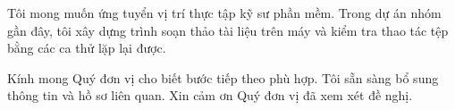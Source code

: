 Tôi mong muốn ứng tuyển vị trí thực tập kỹ sư phần mềm. Trong dự án nhóm gần đây, tôi xây dựng trình soạn thảo tài liệu trên máy và kiểm tra thao tác tệp bằng các ca thử lặp lại được.

Kính mong Quý đơn vị cho biết bước tiếp theo phù hợp. Tôi sẵn sàng bổ sung thông tin và hồ sơ liên quan. Xin cảm ơn Quý đơn vị đã xem xét đề nghị.
